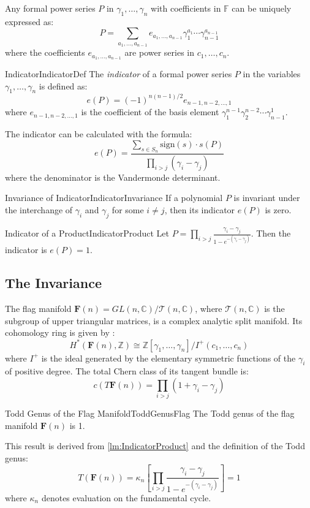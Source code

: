 \documentclass{ut-thesis}
\newenvironment{Proof}[1][]
  {\begin{ProofTcb}[#1]}
  {\end{ProofTcb}}
\begin{document}
Any formal power series $P$ in $\gamma_1, \dots, \gamma_n$ with coefficients in $\mathbb{F}$ can be uniquely expressed as:
\[
P = \sum_{a_1, \dots, a_{n-1}} e_{a_1, \dots, a_{n-1}} \gamma_1^{a_1} \cdots \gamma_{n-1}^{a_{n-1}}
\]
where the coefficients $e_{a_1, \dots, a_{n-1}}$ are power series in $c_1, \dots, c_n$.

\begin{defn}{Indicator}{IndicatorDef}
The \emph{indicator} of a formal power series $P$ in the variables $\gamma_1, \dots, \gamma_n$ is defined as:
\[
e(P) = (-1)^{n(n-1)/2} e_{n-1, n-2, \dots, 1}
\]
where $e_{n-1, n-2, \dots, 1}$ is the coefficient of the basis element $\gamma_1^{n-1}\gamma_2^{n-2}\cdots\gamma_{n-1}^1$.
\end{defn}

The indicator can be calculated with the formula:
\[
e(P) = \frac{\sum_{s \in S_n} \text{sign}(s) \cdot s(P)}{\prod_{i>j} (\gamma_i - \gamma_j)}
\]
where the denominator is the Vandermonde determinant.

\begin{lem}{Invariance of Indicator}{IndicatorInvariance}
If a polynomial $P$ is invariant under the interchange of $\gamma_i$ and $\gamma_j$ for some $i \neq j$, then its indicator $e(P)$ is zero.
\end{lem}

\begin{lem}{Indicator of a Product}{IndicatorProduct}
Let $P = \prod_{i>j} \frac{\gamma_i - \gamma_j}{1 - e^{-(\gamma_i - \gamma_j)}}$. Then the indicator is $e(P) = 1$.
\end{lem}

\subsection*{The Invariance}

The flag manifold $\mathbf{F}(n) = GL(n, \mathbb{C}) / \mathcal{T}(n, \mathbb{C})$, where $\mathcal{T}(n,
\mathbb{C})$ is the subgroup of upper triangular matrices, is a complex analytic split manifold. Its
cohomology ring is given by \cite{NateKTheory}:
\[
H^*(\mathbf{F}(n), \mathbb{Z}) \cong \mathbb{Z}[\gamma_1, \dots, \gamma_n] / I^+(c_1, \dots, c_n)
\]
where $I^+$ is the ideal generated by the elementary symmetric functions of the $\gamma_i$ of positive degree. The total Chern class of its tangent bundle is:
\[
c(T\mathbf{F}(n)) = \prod_{i>j} (1 + \gamma_i - \gamma_j)
\]

\begin{thm}{Todd Genus of the Flag Manifold}{ToddGenusFlag}
The Todd genus of the flag manifold $\mathbf{F}(n)$ is 1.
\end{thm}
\begin{Proof}
This result is derived from \cref{lm:IndicatorProduct} and the definition of the Todd genus:
\[
T(\mathbf{F}(n)) = \kappa_n \left[ \prod_{i>j} \frac{\gamma_i - \gamma_j}{1 - e^{-(\gamma_i - \gamma_j)}} \right] = 1
\]
where $\kappa_n$ denotes evaluation on the fundamental cycle.
\end{Proof}
\end{document}
